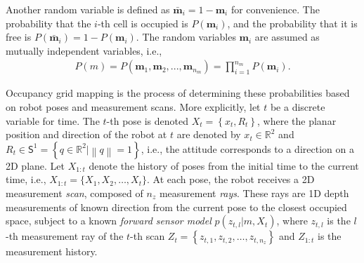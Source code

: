 \documentclass[letterpaper, 10pt]{ieeeconf}
\newcommand{\norm}[1]{\ensuremath{\left\| #1 \right\|}}
\newcommand{\braces}[1]{\ensuremath{\left\{ #1 \right\}}}
\renewcommand{\Re}{\ensuremath{\mathbb{R}}}
\newcommand{\Sph}{\ensuremath{\mathsf{S}}}
\begin{document}
Another random variable is defined as $\bar{\mathbf{m}}_i=1-\mathbf{m}_i$ for convenience. The probability that the $i$-th cell is occupied is $P(\mathbf{m}_i)$, and the probability that it is free is $P(\bar{\mathbf{m}}_i)=1-P(\mathbf{m}_i)$. The random variables $\mathbf{m}_i$ are assumed as mutually independent variables, i.e.,
\begin{align}
P(m)=P(\mathbf{m}_1,\mathbf{m}_2,...,\mathbf{m}_{n_m})=\prod_{i=1}^{n_m}P(\mathbf{m}_i).
\end{align}

Occupancy grid mapping is the process of determining these probabilities based on robot poses and measurement scans. 
More explicitly, let $t$ be a discrete variable for time. The $t$-th pose is denoted $X_t=\braces{x_t,R_t}$, where the planar position and direction of the robot at $t$ are denoted by $x_t\in\Re^2$ and $R_t\in\Sph^1=\braces{q\in\Re^2|\norm{q}=1}$, i.e., the attitude corresponds to a direction on a 2D plane. 
 Let $X_{1:t}$ denote the history of poses from the initial time to the current time, i.e., $X_{1:t}=\{X_1,X_2,\ldots, X_t\}$. At each pose, the robot receives a 2D measurement \emph{scan}, composed of $n_z$ measurement \emph{rays}. These rays are 1D depth measurements of known direction from the current pose to the closest occupied space, subject to a known \emph{forward sensor model} $p(z_{t,l}|m,X_t)$, where $z_{t,l}$ is the $l$-th measurement ray of the $t$-th scan $Z_t=\braces{z_{t,1},z_{t,2},\ldots,z_{t,n_z}}$ and $Z_{1:t}$ is the measurement history. 
\end{document}
